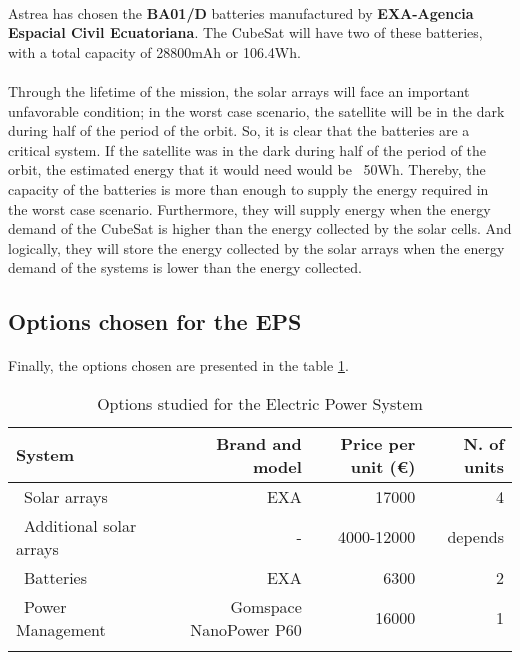\paragraph{}Astrea has chosen the \textbf{BA01/D} batteries manufactured by \textbf{EXA-Agencia Espacial Civil Ecuatoriana}. The CubeSat will have two of these batteries, with a total capacity of 28800mAh or 106.4Wh.

\paragraph{}Through the lifetime of the mission, the solar arrays will face an important unfavorable condition; in the worst case scenario, the satellite will be in the dark during half of the period of the orbit. So, it is clear that the batteries are a critical system. If the satellite was in the dark during half of the period of the orbit, the estimated energy that it would need would be ~50Wh. Thereby, the capacity of the batteries is more than enough to supply the energy required in the worst case scenario. Furthermore, they will supply energy when the energy demand of the CubeSat is higher than the energy collected by the solar cells. And logically, they will store the energy collected by the solar arrays when the energy demand of the systems is lower than the energy collected.

\subsection{Options chosen for the EPS}
\paragraph{}Finally, the options chosen are presented in the table \ref{epsfinal}.

\begin{longtable}{| l | r | r | r | }
\hline
\rowcolor[gray]{0.80}	\textbf{System} &  \textbf{Brand and model}     & \textbf{Price per unit (\euro)}  & \textbf{N. of units}  \\
\hline
\endfirsthead

	   ~Solar arrays & EXA & 17000 & 4\\
	   ~Additional solar arrays & - & 4000-12000 & depends\\
	   ~Batteries & EXA & 6300 & 2 \\
	   ~Power Management & Gomspace NanoPower P60 & 16000 & 1 \\
	\hline

\caption{Options studied for the Electric Power System}
\label{epsfinal}
\end{longtable}